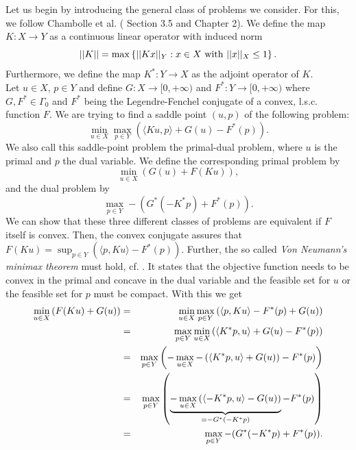 \documentclass[abstracton]{scrreprt}
\begin{document}
        Let us begin by introducing the general class of problems we consider. For this, we follow Chambolle et al. (\cite{Chambolle-et-al-10} Section 3.5 and \cite{Chambolle10afirst-order} Chapter 2). We define the map $K: X \longrightarrow Y$ as a continuous linear operator with induced norm
            $$
                ||K|| = \max \left\{ ||Kx||_{Y} : x \in X \,\, \textnormal{with} \,\, ||x||_{X} \le 1 \right\}.
            $$
        Furthermore, we define the map $K^{\ast}: Y \longrightarrow X$ as the adjoint operator of $K$.\\
        Let $u \in X$, $p \in Y$ and define $G: X \longrightarrow [0, +\infty)$ and $F^{\ast}: Y \longrightarrow [0, +\infty)$ where $G, F^{\ast} \in \Gamma_{0}$ and $F^{\ast}$ being the Legendre-Fenchel conjugate of a convex, l.s.c. function $F$. We are trying to find a saddle point $(u, p)$ of the following problem:
            \begin{equation}
                \min_{u \in X} \max_{p \in Y} \left( \langle Ku, p \rangle + G(u) - F^{\ast}(p) \right).
                \label{eq:the_saddle_point_problem}
            \end{equation}
        We also call this saddle-point problem the primal-dual problem, where $u$ is the primal and $p$ the dual variable. We define the corresponding primal problem by
            \begin{equation}
                \min_{u \in X} \left( G(u) + F(Ku) \right),
                \label{eq:primal_problem}
            \end{equation}
        and the dual problem by
            \begin{equation}
                \max_{p \in Y} -(G^{\ast}(-K^{\ast}p) + F^{\ast}(p)).
                \label{eq:dual_problem}
            \end{equation}
        We can show that these three different classes of problems are equivalent if $F$ itself is convex. Then, the convex conjugate assures that $F(Ku) = \sup_{p \in Y} \left( \langle p, Ku \rangle - F^{\ast}(p) \right)$. Further, the so called \textit{Von Neumann's minimax theorem} must hold, cf. \cite{Zeidler}. It states that the objective function needs to be convex in the primal and concave in the dual variable and the feasible set for $u$ or the feasible set for $p$ must be compact. With this we get
            \begin{eqnarray}
                \min_{u \in X} \left(F(Ku) + G(u)\right) &=& \min_{u \in X} \max_{p \in Y} \left(\langle p, Ku \rangle - F^{\ast}(p) + G(u) \right) \notag \\
                &=& \max_{p \in Y} \min_{u \in X} \left(\langle K^{\ast}p, u \rangle + G(u) - F^{\ast}(p) \right) \notag \\
                &=& \max_{p \in Y} \left( -\max_{u \in X} -\left( \langle K^{\ast}p, u \rangle + G(u) \right) - F^{\ast}(p) \right) \notag \\
                &=& \max_{p \in Y} \left( \underbrace{-\max_{u \in X} \left( \langle -K^{\ast}p, u \rangle - G(u) \right)}_{= -G^{\ast}(-K^{\ast}p)} - F^{\ast}(p) \right) \notag \\
                &=& \max_{p \in Y} -(G^{\ast}(-K^{\ast}p) + F^{\ast}(p)). \notag
            \end{eqnarray}
\end{document}
